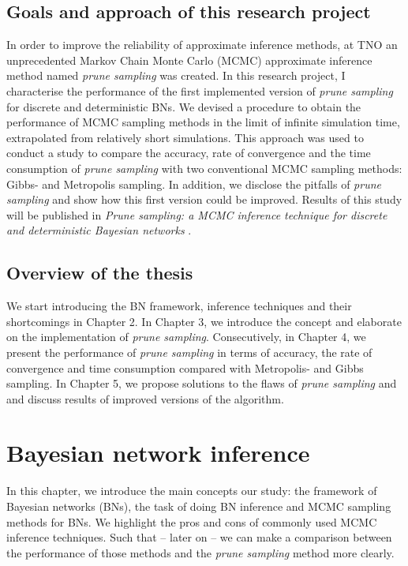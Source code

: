 \documentclass[a4paper, twoside, 11pt]{report}
\theoremstyle{plain}
\theoremstyle{definition}
\theoremstyle{remark}
\newcommand{\ps}{\textit{prune sampling }}
\begin{document}
\section{Goals and approach of this research project}
In order to improve the reliability of approximate inference methods, at TNO an unprecedented Markov Chain Monte Carlo (MCMC) approximate inference method named \ps was created. In this research project, I characterise the performance of the first implemented version of \ps for discrete and deterministic BNs. We devised a procedure to obtain the performance of MCMC sampling methods in the limit of infinite simulation time, extrapolated from relatively short simulations. This approach was used to conduct a study to compare the accuracy, rate of convergence and the time consumption of \ps with two conventional MCMC sampling methods: Gibbs- and Metropolis sampling. In addition, we disclose the pitfalls of \ps and show how this first version could be improved. Results of this study will be published in \textit{Prune sampling: a MCMC inference technique for discrete and deterministic Bayesian networks} \cite{phillipson2018}.


\section{Overview of the thesis}
We start introducing the BN framework, inference techniques and their shortcomings in Chapter 2. In Chapter 3, we introduce the concept and elaborate on the implementation of \textit{prune sampling}. Consecutively, in Chapter 4, we present the performance of \ps in terms of accuracy, the rate of convergence and time consumption compared with Metropolis- and Gibbs sampling. In Chapter 5, we propose solutions to the flaws of \ps and and discuss results of improved versions of the algorithm.

\chapter{Bayesian network inference}\label{ch:2}
In this chapter, we introduce the main concepts our study: the framework of Bayesian networks (BNs), the task of doing BN inference and \gls{MCMC} sampling methods for BNs. We highlight the pros and cons of commonly used MCMC inference techniques. Such that -- later on -- we can make a comparison between the performance of those methods and the \ps method more clearly.
\end{document}
